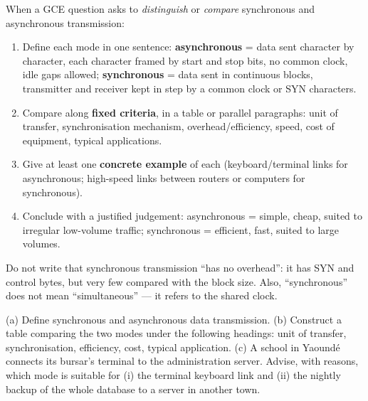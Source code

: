 \documentclass[11pt]{article}
\begin{document}
\begin{methode}
When a GCE question asks to \emph{distinguish} or \emph{compare} synchronous and asynchronous transmission:
\begin{enumerate}
\item Define each mode in one sentence: \textbf{asynchronous} = data sent character by character, each character framed by start and stop bits, no common clock, idle gaps allowed; \textbf{synchronous} = data sent in continuous blocks, transmitter and receiver kept in step by a common clock or SYN characters.
\item Compare along \textbf{fixed criteria}, in a table or parallel paragraphs: unit of transfer, synchronisation mechanism, overhead/efficiency, speed, cost of equipment, typical applications.
\item Give at least one \textbf{concrete example} of each (keyboard/terminal links for asynchronous; high-speed links between routers or computers for synchronous).
\item Conclude with a justified judgement: asynchronous = simple, cheap, suited to irregular low-volume traffic; synchronous = efficient, fast, suited to large volumes.
\end{enumerate}
\begin{attention}[Trap]
Do not write that synchronous transmission ``has no overhead'': it has SYN and control bytes, but very few compared with the block size. Also, ``synchronous'' does not mean ``simultaneous'' — it refers to the shared clock.
\end{attention}
\end{methode}

\begin{experience}
(a) Define synchronous and asynchronous data transmission. (b) Construct a table comparing the two modes under the following headings: unit of transfer, synchronisation, efficiency, cost, typical application. (c) A school in Yaound\'e connects its bursar's terminal to the administration server. Advise, with reasons, which mode is suitable for (i) the terminal keyboard link and (ii) the nightly backup of the whole database to a server in another town.
\end{experience}
\end{document}
